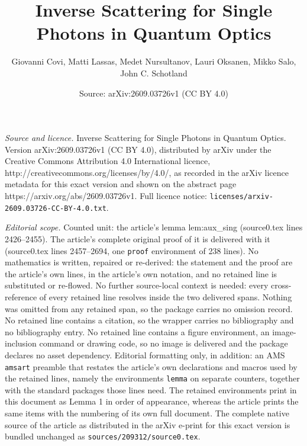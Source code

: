 \documentclass[10pt,a4paper]{amsart}
\title{Inverse Scattering for Single Photons in Quantum Optics}
\author{Giovanni Covi, Matti Lassas, Medet Nursultanov, Lauri Oksanen, Mikko Salo, John C. Schotland}
\date{Source: arXiv:2609.03726v1 (CC BY 4.0)}
\begin{document}
\maketitle

\noindent\emph{Source and licence.} Inverse Scattering for Single Photons in Quantum Optics. Version arXiv:2609.03726v1 (CC BY 4.0), distributed by arXiv under the Creative Commons Attribution 4.0 International licence, http://creativecommons.org/licenses/by/4.0/, as recorded in the arXiv licence metadata for this exact version and shown on the abstract page https://arxiv.org/abs/2609.03726v1. Full licence notice: \texttt{licenses/arxiv-2609.03726-CC-BY-4.0.txt}.\par\smallskip

\noindent\textit{Editorial scope.} Counted unit: the article's lemma lem:aux\_sing (source0.tex lines 2426--2455). The article's complete original proof of it is delivered with it (source0.tex lines 2457--2694, one \texttt{proof} environment of 238 lines). No mathematics is written, repaired or re-derived: the statement and the proof are the article's own lines, in the article's own notation, and no retained line is substituted or re-flowed.  No further source-local context is needed: every cross-reference of every retained line resolves inside the two delivered spans.  Nothing was omitted from any retained span, so the package carries no omission record.  No retained line contains a citation, so the wrapper carries no bibliography and no bibliography entry.  No retained line contains a figure environment, an image-inclusion command or drawing code, so no image is delivered and the package declares no asset dependency.  Editorial formatting only, in addition: an AMS \texttt{amsart} preamble that restates the article's own declarations and macros used by the retained lines, namely the environments \texttt{lemma} on separate counters, together with the standard packages those lines need.  The retained environments print in this document as Lemma 1 in order of appearance, whereas the article prints the same items with the numbering of its own full document.  The complete native source of the article as distributed in the arXiv e-print for this exact version is bundled unchanged as \texttt{sources/209312/source0.tex}.
\end{document}
